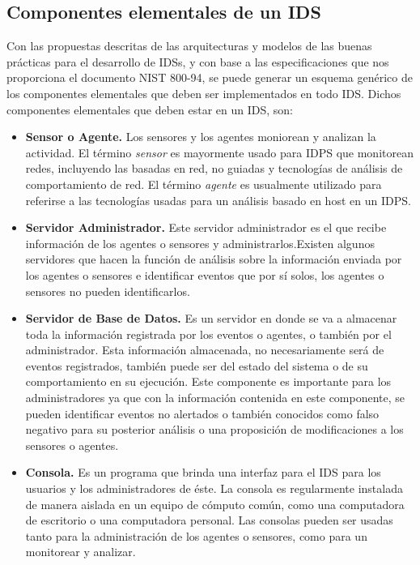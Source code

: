 \subsection{Componentes elementales de un IDS}

Con las propuestas descritas de las arquitecturas y modelos de las buenas prácticas para el desarrollo de IDSs, y con base a las especificaciones que nos proporciona el documento NIST 800-94, se puede generar un esquema genérico de los componentes elementales que deben ser implementados en todo IDS. Dichos componentes elementales que deben estar en un IDS, son: \\

\begin{itemize}
	
	\item \textbf{Sensor o Agente.} Los sensores y los agentes moniorean y analizan la actividad. El término \textit{sensor} es mayormente usado para IDPS que monitorean redes, incluyendo las basadas en red, no guiadas y tecnologías de análisis de comportamiento de red. El término \textit{agente} es usualmente utilizado para referirse a las tecnologías usadas para un análisis basado en host en un IDPS.
	
	\item \textbf{Servidor Administrador.} Este servidor administrador es el que recibe información de los agentes o sensores y administrarlos.Existen algunos servidores que hacen la función de análisis sobre la información enviada por los agentes o sensores e identificar eventos que por sí solos, los agentes o sensores no pueden identificarlos.
	
	\item \textbf{Servidor de Base de Datos.} Es un servidor en donde se va a almacenar toda la información registrada por los eventos o agentes, o también por el administrador. Esta información almacenada, no necesariamente será de eventos registrados, también puede ser del estado del sistema o de su comportamiento en su ejecución. Este componente es importante para los administradores ya que con la información contenida en este componente, se pueden identificar eventos no alertados o también conocidos como falso negativo para su posterior análisis o una proposición de modificaciones a los sensores o agentes.
	
	\item \textbf{Consola.} Es un programa que brinda una interfaz para el IDS para los usuarios y los administradores de éste. La consola es regularmente instalada de manera aislada en un equipo de cómputo común, como una computadora de escritorio o una computadora personal. Las consolas pueden ser usadas tanto para la administración de los agentes o sensores, como para un monitorear y analizar.
	

\end{itemize}
